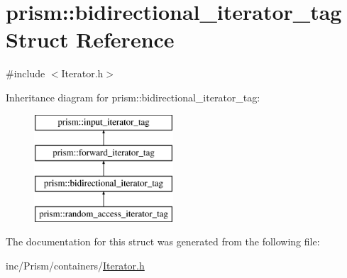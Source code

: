 \hypertarget{structprism_1_1bidirectional__iterator__tag}{}\section{prism\+:\+:bidirectional\+\_\+iterator\+\_\+tag Struct Reference}
\label{structprism_1_1bidirectional__iterator__tag}


{\ttfamily \#include $<$Iterator.\+h$>$}

Inheritance diagram for prism\+:\+:bidirectional\+\_\+iterator\+\_\+tag\+:\begin{figure}[H]
\begin{center}
\leavevmode
\includegraphics[height=4.000000cm]{structprism_1_1bidirectional__iterator__tag}
\end{center}
\end{figure}


The documentation for this struct was generated from the following file\+:\begin{DoxyCompactItemize}
\item 
inc/\+Prism/containers/\hyperlink{_iterator_8h}{Iterator.\+h}\end{DoxyCompactItemize}
